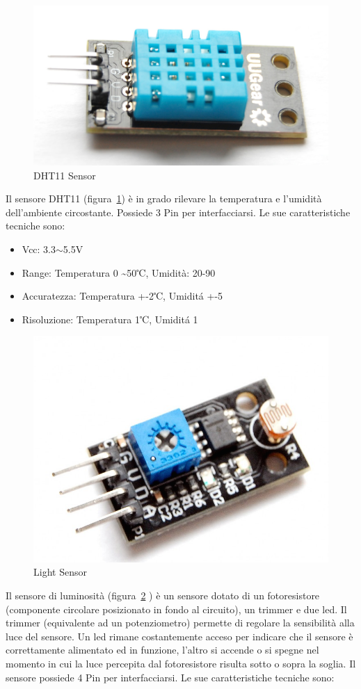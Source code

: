 \begin{figure}
\centering
\includegraphics[width=0.7\linewidth]{Figures/Sensors&Rasp/dht11}
\caption[dht11]{DHT11 Sensor}
\label{fig:dht11}
\end{figure}

 Il sensore DHT11 (figura~\ref{fig:dht11}) è in grado rilevare la temperatura e l'umidità dell'ambiente circostante. Possiede 3 Pin per interfacciarsi.
 Le sue caratteristiche tecniche sono:
 
 \begin{itemize}
 	\item Vcc: 3.3$\sim$5.5V
 	\item Range: Temperatura 0 \textasciitilde 50℃, Umidità:  20-90%
 	\item Accuratezza: Temperatura +-2℃, Umidit\'a +-5%
 	\item Risoluzione: Temperatura  1℃, Umidit\'a  1%
 \end{itemize}
 
\begin{figure}
	\centering
	\includegraphics[width=0.7\linewidth]{Figures/Sensors&Rasp/light}
	\caption[light]{Light Sensor}
	\label{fig:light}

\end{figure}


Il sensore di luminosità (figura~\ref{fig:light} ) è un sensore dotato di un fotoresistore (componente circolare posizionato in fondo al circuito), un trimmer e due led. Il trimmer (equivalente ad un potenziometro) permette di regolare la sensibilità alla luce del sensore. Un led rimane costantemente acceso per indicare che il sensore è correttamente alimentato ed in funzione, l'altro si accende o si spegne nel momento in cui la luce percepita dal fotoresistore risulta sotto o sopra la soglia. Il sensore possiede 4 Pin per interfacciarsi.
Le sue caratteristiche tecniche sono:

